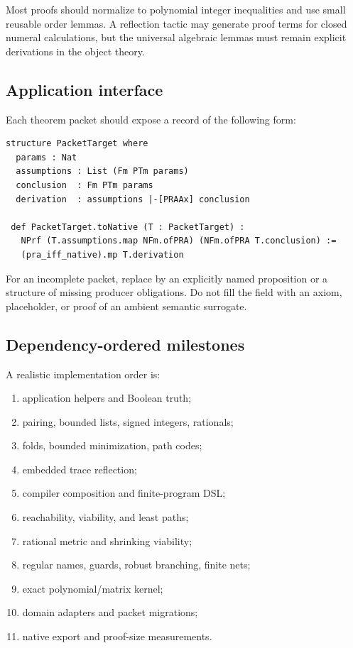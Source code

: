 Most proofs should normalize to polynomial integer inequalities and use small
reusable order lemmas.  A reflection tactic may generate proof terms for
closed numeral calculations, but the universal algebraic lemmas must remain
explicit derivations in the object theory.

\subsection{Application interface}

Each theorem packet should expose a record of the following form:

\begin{lstlisting}[style=lean]
structure PacketTarget where
  params : Nat
  assumptions : List (Fm PTm params)
  conclusion  : Fm PTm params
  derivation  : assumptions |-[PRAAx] conclusion

 def PacketTarget.toNative (T : PacketTarget) :
   NPrf (T.assumptions.map NFm.ofPRA) (NFm.ofPRA T.conclusion) :=
   (pra_iff_native).mp T.derivation
\end{lstlisting}

For an incomplete packet, replace  by an explicitly named
 proposition or a structure of missing producer obligations.  Do
not fill the field with an axiom,  placeholder, or proof of an
ambient semantic surrogate.

\subsection{Dependency-ordered milestones}

A realistic implementation order is:

\begin{enumerate}
\item application helpers and Boolean truth;
\item pairing, bounded lists, signed integers, rationals;
\item folds, bounded minimization, path codes;
\item embedded trace reflection;
\item compiler composition and finite-program DSL;
\item reachability, viability, and least paths;
\item rational metric and shrinking viability;
\item regular names, guards, robust branching, finite nets;
\item exact polynomial/matrix kernel;
\item domain adapters and packet migrations;
\item native export and proof-size measurements.
\end{enumerate}

